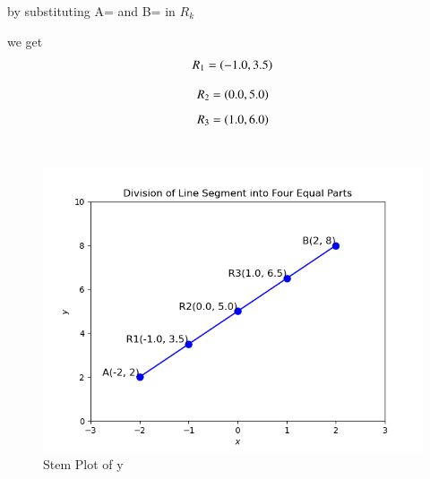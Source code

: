 \documentclass[journal]{IEEEtran}
\begin{document}
by substituting A= and B= in $R_k$

we get \\
\begin{align}
   R_1=\left(-1.0,3.5\right)
\end{align}

\begin{align}
   R_2=\left(0.0,5.0\right)
\end{align}
\begin{align}
   R_3=\left(1.0,6.0\right)
\end{align}	\\

\begin{figure}
    \centering
    \includegraphics[width=0.5\linewidth]{Figure_1.png}
    \caption{Stem Plot of y}
    \label{stemplot}
\end{figure}
\end{document}
